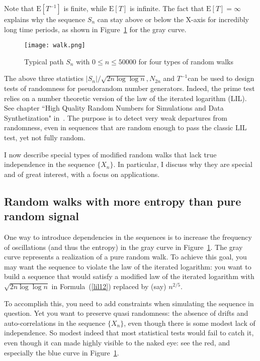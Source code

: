 \documentclass[oneside,10pt]{book}
\begin{document}
\noindent Note that $\text{E}[T^{-1}]$ is finite, while $\text{E}[T]$ is infinite. The fact that
 $\text{E}[T]=\infty$ explains why the sequence $S_n$ can stay above or below the X-axis for incredibly long time periods, as shown
 in Figure~\ref{fig:walk} for the gray curve. 

\begin{figure}%
\centering
\texttt{[image: walk.png]}  
\caption{Typical path $S_n$ with $0\leq n\leq \num{50000}$ for four types of random walks}
\label{fig:walk}
\end{figure}

The above three statistics $|S_n|/\sqrt{2n\log\log n}, N_{2n}$ and $T^{-1}$can be used to design tests of randomness for 
\textcolor{index}{pseudorandom number generators}. Indeed, the \textcolor{index}{prime test}   relies on a number theoretic version of the law of the iterated logarithm (LIL). See chapter ``High Quality Random Numbers for Simulations and Data Synthetization" in~\cite{vgsynthetic}.
The purpose is to detect very weak departures from randomness, even in sequences that are random enough to pass the classic LIL test, yet not fully random. 
 
I now describe special types of modified random walks that lack true independence in the sequence $\{X_n\}$. In particular, I discuss why
 they are special and of great interest, with a focus on applications.


\subsection{Random walks with more entropy than pure random signal}\label{azxa}

One way to introduce dependencies in the sequences is to increase the frequency of oscillations (and thus the entropy) in the gray curve in 
 Figure~\ref{fig:walk}. The gray curve represents a realization of a pure random walk. 
 To achieve this goal, you may want the sequence to violate the law of the iterated logarithm: you want to build a sequence that would satisfy a modified law of the iterated logarithm with $\sqrt{2n\log\log n}$ in Formula~(\ref{lil12}) replaced by (say) $n^{2/5}$. 

To accomplish this, you need to add constraints when simulating the sequence in question.  Yet you want to preserve quasi randomness: 
the absence of drifts and auto-correlations in 
 the sequence $\{X_n\}$, even though there is some modest lack of independence. So modest indeed that most statistical tests would fail to catch it, even though it can made highly visible to the naked eye: see the red, and especially the blue curve in Figure~\ref{fig:walk}. 
\end{document}
